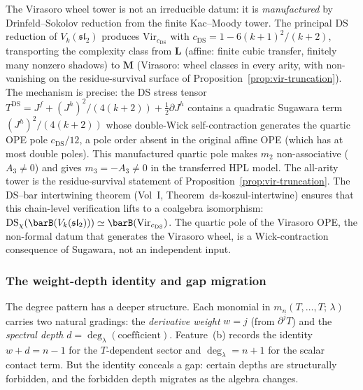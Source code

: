 \begin{remark}%
\label{rem:gravity-ds-manufactured}%
%
The Virasoro wheel tower is not an irreducible datum: it is
\emph{manufactured} by Drinfeld--Sokolov reduction from the finite
Kac--Moody tower.
The principal DS reduction of $V_k(\mathfrak{sl}_2)$ produces
$\mathrm{Vir}_{c_{\mathrm{DS}}}$ with
$c_{\mathrm{DS}} = 1 - 6(k+1)^2/(k+2)$, transporting the
complexity class from $\mathbf{L}$ (affine: finite cubic transfer,
finitely many nonzero shadows) to $\mathbf{M}$ (Virasoro: wheel
classes in every arity, with non-vanishing on the residue-survival
surface of Proposition~\ref{prop:vir-truncation}).
The mechanism is precise: the DS stress tensor
$T^{\mathrm{DS}} = J^f + (J^h)^2/(4(k+2)) + \tfrac{1}{2}\partial J^h$
contains a quadratic Sugawara term $(J^h)^2/(4(k+2))$ whose
double-Wick self-contraction generates the quartic OPE pole
$c_{\mathrm{DS}}/12$, a pole order absent in the original affine
OPE (which has at most double poles). This manufactured quartic pole
makes $m_2$ non-associative ($A_3 \ne 0$) and gives
$m_3 = -A_3 \ne 0$ in the transferred HPL model. The all-arity tower is
the residue-survival statement of Proposition~\ref{prop:vir-truncation}.
The DS--bar intertwining theorem (Vol~I,
Theorem~ds-koszul-intertwine) ensures that this chain-level
verification lifts to a coalgebra isomorphism:
$\mathrm{DS}_\chi(\barB(V_k(\mathfrak{sl}_2))) \simeq
\barB(\mathrm{Vir}_{c_{\mathrm{DS}}})$.
The quartic pole of the Virasoro OPE, the non-formal datum that
generates the Virasoro wheel, is a
Wick-contraction consequence of Sugawara, not an independent
input.
\end{remark}

\subsubsection*{The weight-depth identity and gap migration}

The degree pattern has a deeper structure.
Each monomial in $m_n(T,\ldots,T;\,\lambda)$ carries two
natural gradings: the \emph{derivative weight}
$w = j$ (from $\partial^j T$) and the \emph{spectral depth}
$d = \deg_\lambda(\text{coefficient})$.
Feature~(b) records the identity $w + d = n - 1$ for the
$T$-dependent sector and $\deg_\lambda = n + 1$ for the scalar
contact term. But the identity conceals a gap: certain depths
are structurally forbidden, and the forbidden depth migrates as
the algebra changes.

